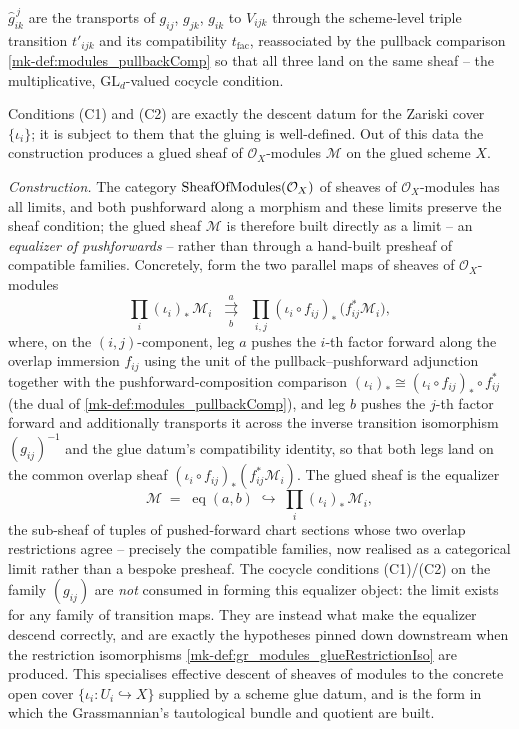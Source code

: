 \begin{definition}
\begin{enumerate}
      \(\widehat{g}_{ik}^{\,j}\) are the transports of \(g_{ij}\), \(g_{jk}\),
      \(g_{ik}\) to \(V_{ijk}\) through the scheme-level triple transition
      \(t'_{ijk}\) and its compatibility \(t_{\mathrm{fac}}\), reassociated by the
      pullback comparison \ref{mk-def:modules_pullbackComp} so that all three land on
      the same sheaf -- the multiplicative, \(\mathrm{GL}_d\)-valued cocycle
      condition.
  \end{enumerate}
  Conditions (C1) and (C2) are exactly the descent datum for the Zariski cover
  \(\{\iota_i\}\); it is subject to them that the gluing is well-defined. Out of this
  data the construction produces a glued sheaf of \(\mathcal{O}_X\)-modules
  \(\mathcal{M}\) on the glued scheme \(X\).

  \emph{Construction.} The category \(\mathrm{SheafOfModules}(\mathcal{O}_X)\) of sheaves of
  \(\mathcal{O}_X\)-modules has all limits, and both pushforward along a morphism and
  these limits preserve the sheaf condition; the glued sheaf \(\mathcal{M}\) is therefore
  built directly as a limit -- an \emph{equalizer of pushforwards} -- rather than through a
  hand-built presheaf of compatible families. Concretely, form the two parallel maps of
  sheaves of \(\mathcal{O}_X\)-modules
  \[
    \prod_{i} (\iota_i)_{*}\,\mathcal{M}_i
      \;\;\underset{b}{\overset{a}{\rightrightarrows}}\;\;
    \prod_{i,j} (\iota_i \circ f_{ij})_{*}\,\bigl(f_{ij}^{*}\mathcal{M}_i\bigr),
  \]
  where, on the \((i,j)\)-component, leg \(a\) pushes the \(i\)-th factor forward along the
  overlap immersion \(f_{ij}\) using the unit of the pullback--pushforward adjunction
  together with the pushforward-composition comparison
  \((\iota_i)_{*} \cong (\iota_i \circ f_{ij})_{*}\circ f_{ij}^{*}\) (the dual of
  \ref{mk-def:modules_pullbackComp}), and leg \(b\) pushes the \(j\)-th factor forward and
  additionally transports it across the inverse transition isomorphism \((g_{ij})^{-1}\)
  and the glue datum's compatibility identity, so that both legs land on the common overlap
  sheaf \((\iota_i \circ f_{ij})_{*}(f_{ij}^{*}\mathcal{M}_i)\). The glued sheaf is the
  equalizer
  \[
    \mathcal{M} \;=\; \operatorname{eq}(a,b) \;\hookrightarrow\; \prod_{i} (\iota_i)_{*}\,\mathcal{M}_i,
  \]
  the sub-sheaf of tuples of pushed-forward chart sections whose two overlap restrictions
  agree -- precisely the compatible families, now realised as a categorical limit rather than
  a bespoke presheaf. The cocycle conditions (C1)/(C2) on the family \((g_{ij})\) are
  \emph{not} consumed in forming this equalizer object: the limit exists for any family of
  transition maps. They are instead what make the equalizer descend correctly, and are
  exactly the hypotheses pinned down downstream when the restriction isomorphisms
  \ref{mk-def:gr_modules_glueRestrictionIso} are produced. This specialises effective descent
  of sheaves of modules to the concrete open cover \(\{\iota_i : U_i \hookrightarrow X\}\)
  supplied by a scheme glue datum, and is the form in which the Grassmannian's
  tautological bundle and quotient are built.


\end{definition}
